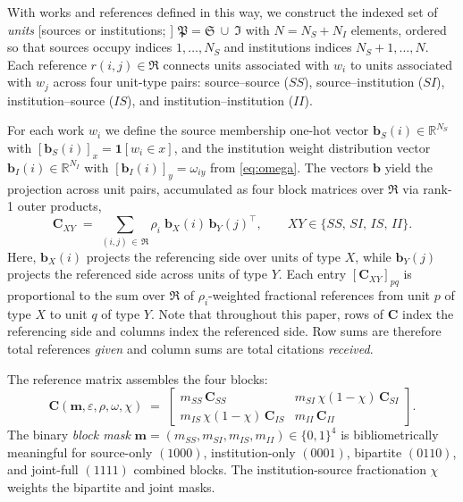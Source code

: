 With works and references defined in this way, we construct the indexed 
set of \emph{units} [sources or institutions; \textcite{pinskiCitationInfluenceJournal1976}]
$\mathfrak{P}=\mathfrak{S}\ \cup\ \mathfrak{I}$ with $N=N_S+N_I$ elements,
ordered so that sources occupy indices $1,\dots,N_S$ and institutions
indices $N_S+1,\dots,N$. Each reference $r(i,j) \in \mathfrak{R}$ connects units
associated with $w_i$ to units associated with $w_j$
across four unit-type pairs: source--source ($SS$), source--institution
($SI$), institution--source ($IS$), and institution--institution ($II$).

For each work $w_i$ we define the source membership one-hot vector
$\mathbf{b}_S(i)\in\mathbb{R}^{N_S}$ with $[\mathbf{b}_S(i)]_x=\mathbf{1}[w_i\in x]$,
and the institution weight distribution vector
$\mathbf{b}_I(i)\in\mathbb{R}^{N_I}$ with $[\mathbf{b}_I(i)]_y=\omega_{iy}$
from \eqref{eq:omega}. The vectors $\mathbf{b}$ yield the projection across unit
pairs, accumulated as four block matrices over $\mathfrak{R}$ via
rank-1 outer products,
\begin{equation}
	\mathbf{C}_{XY} \;=\; \sum_{(i,j)\,\in\,\mathfrak{R}}
	\rho_i\;\mathbf{b}_X(i)\,\mathbf{b}_Y(j)^\top,
	\qquad XY\in\{SS,\,SI,\,IS,\,II\}.
	\label{eq:Cblock}
\end{equation}
Here, $\mathbf{b}_X(i)$ projects the referencing side over units of type $X$, 
while $\mathbf{b}_Y(j)$ projects the referenced side
across units of type $Y$. Each entry $[\mathbf{C}_{XY}]_{pq}$ is proportional
to the sum over $\mathfrak{R}$ of $\rho_i$-weighted fractional references from unit $p$ of type $X$ to unit $q$ of type $Y$. Note that throughout this paper, rows of $\mathbf{C}$ index the referencing side and columns index the referenced side. Row sums are therefore total references \emph{given} and column sums are total citations \emph{received}.

The reference matrix assembles the four blocks:
\begin{equation}
	\mathbf{C}(\mathbf{m}, \varepsilon, \rho, \omega, \chi) \;=\;
	\begin{bmatrix}
		m_{SS}\,\mathbf{C}_{SS} &
		m_{SI}\,\chi(1-\chi)\,\mathbf{C}_{SI} \\[4pt]
		m_{IS}\,\chi(1-\chi)\,\mathbf{C}_{IS} &
		m_{II}\,\mathbf{C}_{II}
	\end{bmatrix}.
	\label{eq:C}
\end{equation}
The binary \textit{block mask} $\mathbf{m}=(m_{SS},m_{SI},m_{IS},m_{II})\in\{0,1\}^4$
is bibliometrically meaningful for source-only $(1000)$, institution-only $(0001)$,
bipartite $(0110)$, and joint-full $(1111)$ combined blocks.
The institution-source fractionation $\chi$ weights the bipartite and joint masks.

